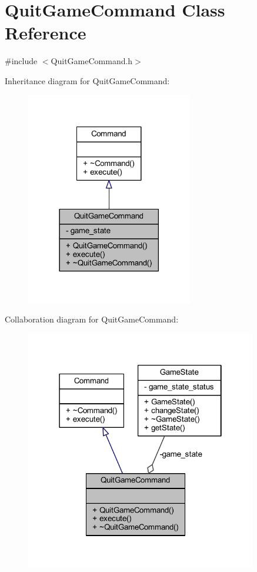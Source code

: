 \hypertarget{class_quit_game_command}{}\section{Quit\+Game\+Command Class Reference}
\label{class_quit_game_command}


{\ttfamily \#include $<$Quit\+Game\+Command.\+h$>$}



Inheritance diagram for Quit\+Game\+Command\+:
\nopagebreak
\begin{figure}[H]
\begin{center}
\leavevmode
\includegraphics[width=206pt]{class_quit_game_command__inherit__graph}
\end{center}
\end{figure}


Collaboration diagram for Quit\+Game\+Command\+:
\nopagebreak
\begin{figure}[H]
\begin{center}
\leavevmode
\includegraphics[width=286pt]{class_quit_game_command__coll__graph}
\end{center}
\end{figure}
